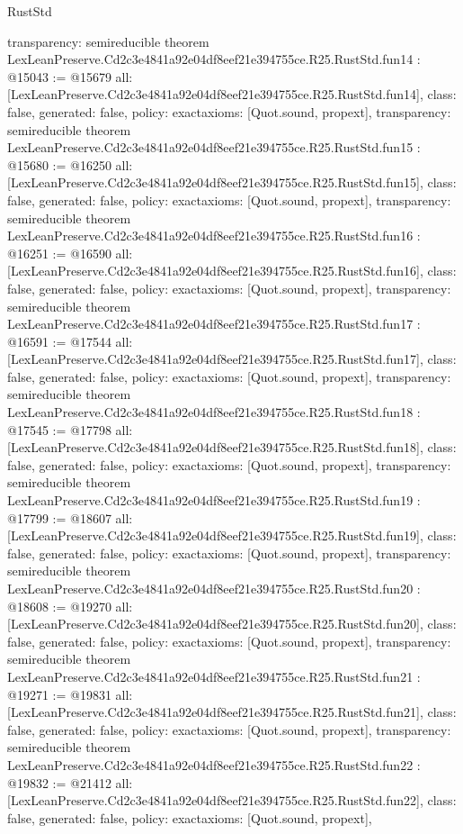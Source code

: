 \begin{lexlean}{RustStd}
\begin{coremodule}
{  transparency: semireducible
}
theorem LexLeanPreserve.Cd2c3e4841a92e04df8eef21e394755ce.R25.RustStd.fun14 : @15043 := @15679 {
  all: [LexLeanPreserve.Cd2c3e4841a92e04df8eef21e394755ce.R25.RustStd.fun14],
  class: false,
  generated: false,
  policy: exact{axioms: [Quot.sound, propext]},
  transparency: semireducible
}
theorem LexLeanPreserve.Cd2c3e4841a92e04df8eef21e394755ce.R25.RustStd.fun15 : @15680 := @16250 {
  all: [LexLeanPreserve.Cd2c3e4841a92e04df8eef21e394755ce.R25.RustStd.fun15],
  class: false,
  generated: false,
  policy: exact{axioms: [Quot.sound, propext]},
  transparency: semireducible
}
theorem LexLeanPreserve.Cd2c3e4841a92e04df8eef21e394755ce.R25.RustStd.fun16 : @16251 := @16590 {
  all: [LexLeanPreserve.Cd2c3e4841a92e04df8eef21e394755ce.R25.RustStd.fun16],
  class: false,
  generated: false,
  policy: exact{axioms: [Quot.sound, propext]},
  transparency: semireducible
}
theorem LexLeanPreserve.Cd2c3e4841a92e04df8eef21e394755ce.R25.RustStd.fun17 : @16591 := @17544 {
  all: [LexLeanPreserve.Cd2c3e4841a92e04df8eef21e394755ce.R25.RustStd.fun17],
  class: false,
  generated: false,
  policy: exact{axioms: [Quot.sound, propext]},
  transparency: semireducible
}
theorem LexLeanPreserve.Cd2c3e4841a92e04df8eef21e394755ce.R25.RustStd.fun18 : @17545 := @17798 {
  all: [LexLeanPreserve.Cd2c3e4841a92e04df8eef21e394755ce.R25.RustStd.fun18],
  class: false,
  generated: false,
  policy: exact{axioms: [Quot.sound, propext]},
  transparency: semireducible
}
theorem LexLeanPreserve.Cd2c3e4841a92e04df8eef21e394755ce.R25.RustStd.fun19 : @17799 := @18607 {
  all: [LexLeanPreserve.Cd2c3e4841a92e04df8eef21e394755ce.R25.RustStd.fun19],
  class: false,
  generated: false,
  policy: exact{axioms: [Quot.sound, propext]},
  transparency: semireducible
}
theorem LexLeanPreserve.Cd2c3e4841a92e04df8eef21e394755ce.R25.RustStd.fun20 : @18608 := @19270 {
  all: [LexLeanPreserve.Cd2c3e4841a92e04df8eef21e394755ce.R25.RustStd.fun20],
  class: false,
  generated: false,
  policy: exact{axioms: [Quot.sound, propext]},
  transparency: semireducible
}
theorem LexLeanPreserve.Cd2c3e4841a92e04df8eef21e394755ce.R25.RustStd.fun21 : @19271 := @19831 {
  all: [LexLeanPreserve.Cd2c3e4841a92e04df8eef21e394755ce.R25.RustStd.fun21],
  class: false,
  generated: false,
  policy: exact{axioms: [Quot.sound, propext]},
  transparency: semireducible
}
theorem LexLeanPreserve.Cd2c3e4841a92e04df8eef21e394755ce.R25.RustStd.fun22 : @19832 := @21412 {
  all: [LexLeanPreserve.Cd2c3e4841a92e04df8eef21e394755ce.R25.RustStd.fun22],
  class: false,
  generated: false,
  policy: exact{axioms: [Quot.sound, propext]},
}
\end{coremodule}
\end{lexlean}
